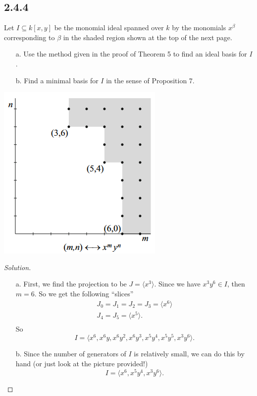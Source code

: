 \documentclass[]{article}
\newcommand\<{\langle}
\renewcommand\>{\rangle}
\newenvironment{solution}
{
	\begin{proof}[Solution] \text{ }
		\\
	}
	{
	\end{proof}
}
\begin{document}
\subsection*{2.4.4} Let $I \subseteq k[x,y]$ be the monomial ideal spanned over $k$ by the monomials $x^\beta$ corresponding to $\beta$ in the shaded region shown at the top of the next page.
\begin{enumerate}
	\item[a.] Use the method given in the proof of Theorem 5 to find an ideal basis for $I$.
	\item[b.] Find a minimal basis for $I$ in the sense of Proposition 7.
\end{enumerate}
\begin{center}
	\includegraphics{2-4-4.png}
\end{center}
\begin{solution}
	\begin{enumerate}
		\item[a.] First, we find the projection to be $J = \<x^3\>$. Since we have $x^3y^6 \in I$, then $m = 6$. So we get the following ``slices''
		\begin{align*}
			J_0 = J_1 = J_2 = J_3 = \<x^6\> \\
			J_4 = J_5 = \<x^5\>. \\
		\end{align*}
		So
		$$
			I = \<x^6, x^6y, x^6y^2,x^6y^3,x^5y^4,x^5y^5,x^3y^6\>.
		$$
		\item[b.] Since the number of generators of $I$ is relatively small, we can do this by hand (or just look at the picture provided!)
		$$
			I = \<x^6,x^5y^4,x^3y^6\>.
		$$
	\end{enumerate}
\end{solution}
\end{document}
